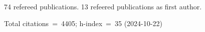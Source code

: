 74 refereed publications. 13 refeered publications as first author.

Total citations~=~4405; h-index~=~35 (2024-10-22)